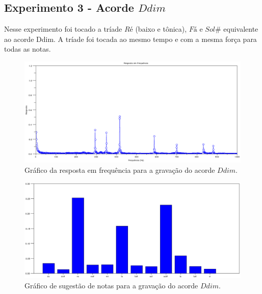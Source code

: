\subsection{Experimento 3 - Acorde $Ddim$}
\label{sec:experimento3}

Nesse experimento foi tocado a tríade $Ré$ (baixo e tônica), $Fá$ e $Sol\#$ equivalente ao acorde Ddim. A tríade foi tocada ao mesmo tempo e com a mesma força para todas as notas.

\begin{figure}[h]
	\centering
		\includegraphics[keepaspectratio=true,scale=0.49]{figuras/Dm/fft_Ddim.eps}
	\caption{Gráfico da resposta em frequência para a gravação do acorde $Ddim$.}
  \label{fig:espectro_Ddim}
\end{figure}

\begin{figure}[h]
	\centering
		\includegraphics[keepaspectratio=true,scale=0.45]{figuras/Dm/notas_Ddim.eps}
	\caption{Gráfico de sugestão de notas para a gravação do acorde $Ddim$.}
  \label{fig:notas_Ddim}
\end{figure}

